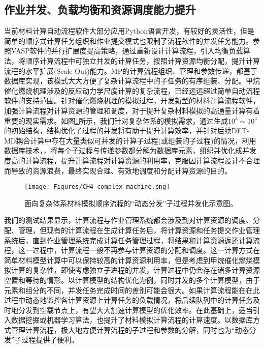 \subsection{作业并发、负载均衡和资源调度能力提升}
当前材料计算自动流程软件大部分应用\textrm{Python}语言开发，有较好的灵活性，但是简单的顺序式计算任务组织和作业提交模式也限制了流程软件的并发任务能力。参照\textrm{VASP}软件的并行扩展度提高策略，通过重新设计计算流程，引入均衡负载算法，将顺序计算流程中可独立并发的计算任务，按照计算资源均衡分配，提升计算流程的水平扩展\textrm{(Scale Out)}能力。\textrm{MP}的计算流程组织、管理和参数传递，都基于数据库实现，该模式大大方便了复杂计算流程中的子任务的有序组装、分配。甲烷催化燃烧机理涉及的反应动力学尺度计算的复杂流程，已经远远超过简单自动流程软件的支持范围。针对催化燃烧机理的模拟过程，开发新型的材料计算流程软件，加强计算流程对计算资源的管理和调度，对于提升复杂材料模拟的高通量计算有着重要的现实需求。如图\ref{CH4_comp_BCC}所示，我们针对复杂体系的模拟需求，通过生成$10^3\sim10^4$的初始结构，结构优化子过程的并发将有助于提升计算效率，并针对后续\textrm{DFT-MD}耦合计算中存在大量类似可并发的计算子过程(或组装的子过程)的情况，利用数据库技术，，将每个子过程与传递参数都分解为数据库元素，组织并优化成并发度高的计算流程，提升计算流程对计算资源的利用率，克服因计算流程设计不合理而导致的资源浪费，最终实现合理、有效地调度和分配计算资源的目的。
\begin{figure}[h!]
\centering
\vskip -2pt
\texttt{[image: Figures/CH4\_complex\_machine.png]}
\caption{面向复杂体系材料模拟顺序流程的``动态分发''子过程并发化示意图。}%
\label{CH4_comp_BCC}
\end{figure}

我们的测试结果显示，计算流程与作业管理系统都会涉及到对计算资源的调度、分配、管理，但现有的计算流程在生成计算任务后，将计算资源和任务提交作业管理系统后，直到作业管理系统完成计算任务管理过程，将结果和计算资源返还计算流程，这一过程中，计算流程一般不再参与计算资源的分配和调度。这一计算方式在简单材料模型计算中可以保持较高的计算资源利用率，但是考虑到甲烷催化燃烧模拟计算的复杂性，即使考虑独立子进程的并发，计算过程中仍会存在诸多计算资源空置和等待的情形。以计算模型的结构优化为例，同时并发的多个计算模型，由于元素和组分的不同，并发任务完成时间的差别可能会很大。如果计算流程能在在此过程中动态地监控各计算资源上计算任务的负载情况，将后续队列中的计算任务及时地分发到空载节点上，有望大大加速计算模型的优化效率。在此基础上，适当引入数据挖掘或机器学习算法，也提升了材料模拟计算流程的计算速度。以数据库方式管理计算流程，极大地方便计算流程的子过程和参数的分解，同时也为``动态分发''子过程提供了便利。

